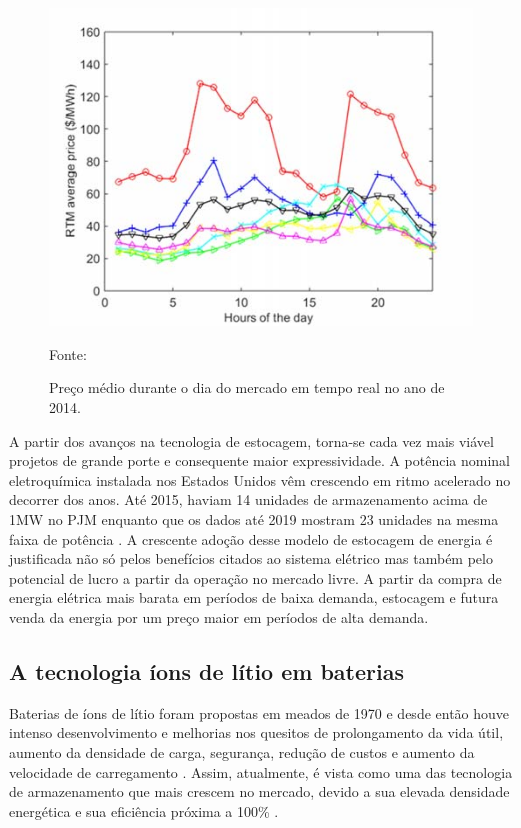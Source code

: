 \begin{figure}[htb]
	\caption{Preço médio durante o dia do mercado em tempo real no ano de 2014.}
	\begin{center}
	    \includegraphics[scale=.6]{figuras/rtm-hourly-2014.png}
	\end{center}
   \begin{center}
      \footnotesize {Fonte: }
   \end{center}
    \label{fig:rtm2014}
\end{figure}

A partir dos avanços na tecnologia de estocagem, torna-se cada vez mais viável projetos de grande porte e consequente maior expressividade. A potência nominal eletroquímica instalada nos Estados Unidos vêm crescendo em ritmo acelerado no decorrer dos anos. Até 2015, haviam 14 unidades de armazenamento acima de 1MW no PJM \cite{Salles2016} enquanto que os dados até 2019 mostram 23 unidades na mesma faixa de potência \cite{doe2019}.
A crescente adoção desse modelo de estocagem de energia é justificada não só pelos benefícios citados ao sistema elétrico mas também pelo potencial de lucro a partir da operação no mercado livre. A partir da compra de energia elétrica mais barata em períodos de baixa demanda, estocagem e futura venda da energia por um preço maior em períodos de alta demanda.

\subsection{A tecnologia íons de lítio em baterias}
Baterias de íons de lítio foram propostas em meados de 1970 \cite{WHITTINGHAM1976} e desde então houve intenso desenvolvimento e melhorias nos quesitos de prolongamento da vida útil, aumento da densidade de carga, segurança, redução de custos e aumento da velocidade de carregamento \cite{Eftekhari2017}. Assim, atualmente, é vista como uma das tecnologia de armazenamento que mais crescem no mercado, devido a sua elevada densidade energética e sua eficiência próxima a 100\% \cite{michigan2018}.

